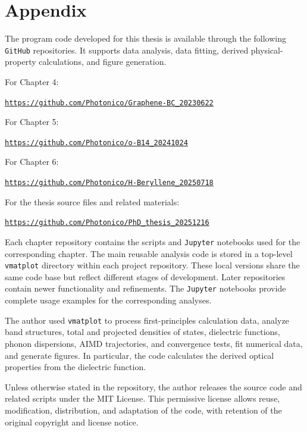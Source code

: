 \chapter*{Appendix}

The program code developed for this thesis is available through the following \texttt{GitHub} repositories.
It supports data analysis, data fitting,
derived physical-property calculations, and figure generation.

For Chapter 4:

\quad\href{https://github.com/Photonico/Graphene-BC_20230622}
{\texttt{https://github.com/Photonico/Graphene-BC\_20230622}}

For Chapter 5:

\quad\href{https://github.com/Photonico/o-B14_20241024}
{\texttt{https://github.com/Photonico/o-B14\_20241024}}

For Chapter 6:

\quad\href{https://github.com/Photonico/H-Beryllene_20250718}
{\texttt{https://github.com/Photonico/H-Beryllene\_20250718}}

For the thesis source files and related materials:

\quad\href{https://github.com/Photonico/PhD_thesis_20251216}
{\texttt{https://github.com/Photonico/PhD\_thesis\_20251216}}

Each chapter repository contains the scripts and \texttt{Jupyter} notebooks used for the corresponding chapter.
The main reusable analysis code is stored in a top-level \texttt{vmatplot} directory within each project repository.
These local versions share the same code base but reflect different stages of development.
Later repositories contain newer functionality and refinements.
The \texttt{Jupyter} notebooks provide complete usage examples for the corresponding analyses.

The author used \texttt{vmatplot} to process first-principles calculation data,
analyze band structures, total and projected densities of states, dielectric functions, phonon dispersions, AIMD trajectories, and convergence tests, fit numerical data, and generate figures.
In particular, the code calculates the derived optical properties from the dielectric function.

Unless otherwise stated in the repository,
the author releases the source code and related scripts under the MIT License.
This permissive license allows reuse, modification, distribution, and adaptation of the code,
with retention of the original copyright and license notice.
